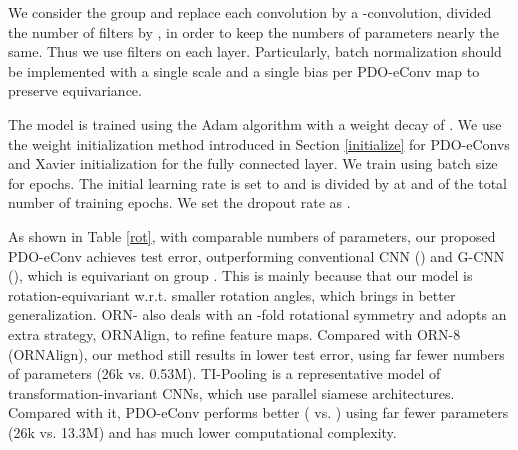 \documentclass{article}
\begin{document}
We consider the group  and replace each convolution by a -convolution, divided the number of filters by , in order to keep the numbers of parameters nearly the same. Thus we use  filters on each layer. Particularly, batch normalization should be implemented with a single scale and a single bias per PDO-eConv map to preserve equivariance. 

The model is trained using the Adam algorithm \cite{kingma2014adam} with a weight decay of . We use the weight initialization method introduced in Section \ref{initialize} for PDO-eConvs and Xavier initialization \cite{glorot2010understanding} for the fully connected layer. We train using batch size  for  epochs. The initial learning rate is set to  and is divided by  at  and  of the total number of training epochs. We set the dropout rate as .
\begin{table}[t]
	\caption{Error rates on MNIST-rot-12k without data augmentation.}\smallskip
	\centering
	\linespread{1.2}\selectfont
	\label{rot}
\end{table}

As shown in Table \ref{rot}, with comparable numbers of parameters, our proposed PDO-eConv achieves  test error, outperforming conventional CNN () and G-CNN (), which is equivariant on group . This is mainly because that our model is rotation-equivariant w.r.t. smaller rotation angles, which brings in better generalization. ORN- also deals with an -fold rotational symmetry and adopts an extra strategy, ORNAlign, to refine feature maps. Compared with ORN-8 (ORNAlign), our method still results in lower test error, using far fewer numbers of parameters (26k vs. 0.53M). TI-Pooling is a representative model of transformation-invariant CNNs, which use parallel siamese architectures. Compared with it, PDO-eConv performs better ( vs. ) using far fewer parameters (26k vs. 13.3M) and has much lower computational complexity.
\end{document}
